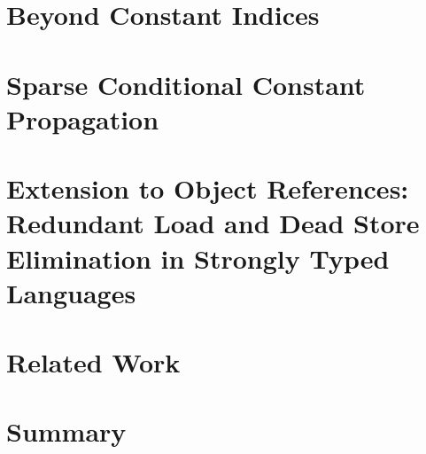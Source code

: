 \section{Beyond Constant Indices}
\label{sec:non-const}


\section{Sparse Conditional Constant Propagation}
\label{sec:scc}

\section{Extension to Object References: Redundant Load and Dead Store Elimination in Strongly Typed Languages}
\label{sec:heap}

\section{Related Work}
\label{sec:related}

\section{Summary}
\label{sec:conclusions}

